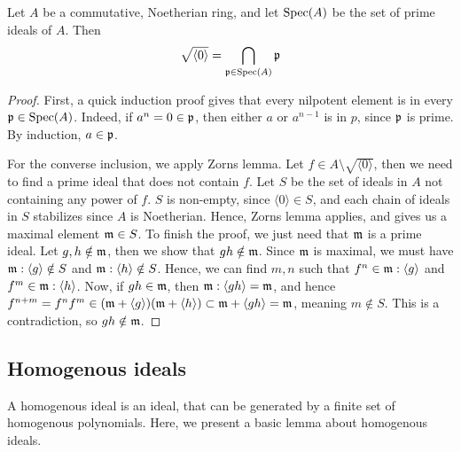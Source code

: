 \begin{theorem}\label{thm:nil_rad_is_cap_primes}
  Let $A$ be a commutative, Noetherian ring, and let $\operatorname{Spec}(A)$ be the set of prime ideals of $A$. Then
  \[\sqrt{\langle 0 \rangle} = \bigcap_{\mathfrak p \in \operatorname{Spec}(A)} \mathfrak p\]
\end{theorem}
\begin{proof}
  First, a quick induction proof gives that every nilpotent element is in every $\mathfrak p \in \operatorname{Spec}(A)$. Indeed, if $a^{n} = 0 \in \mathfrak p$, then either $a$ or $a^{n-1}$ is in $p$, since $\mathfrak p$ is prime. By induction, $a \in \mathfrak p$.

  For the converse inclusion, we apply Zorns lemma. Let $f \in A \setminus \sqrt{\langle 0 \rangle}$, then we need to find a prime ideal that does not contain $f$. Let $S$ be the set of ideals in $A$ not containing any power of $f$. $S$ is non-empty, since $\langle 0 \rangle \in S$, and each chain of ideals in $S$ stabilizes since $A$ is Noetherian. Hence, Zorns lemma applies, and gives us a maximal element $\mathfrak{m} \in S$. To finish the proof, we just need that $\mathfrak{m}$ is a prime ideal. Let $g, h \notin \mathfrak{m}$, then we show that $g h \notin \mathfrak{m}$. Since $\mathfrak{m}$ is maximal, we must have $\mathfrak{m} : \langle g \rangle \notin S$ and $\mathfrak{m} : \langle h \rangle \notin S$. Hence, we can find $m, n$ such that $f^{n} \in \mathfrak{m} : \langle g \rangle$ and $f^{m} \in \mathfrak{m} : \langle h \rangle$. Now, if $g h \in \mathfrak{m}$, then $\mathfrak{m} : \langle g h \rangle = \mathfrak{m}$, and hence $f^{n + m} = f^{n} f^{m} \in (\mathfrak{m} + \langle g \rangle)(\mathfrak{m} + \langle h \rangle) \subset \mathfrak{m} + \langle g h \rangle = \mathfrak{m}$, meaning $m \notin S$. This is a contradiction, so $g h \notin \mathfrak{m}$.
\end{proof}




\subsection{Homogenous ideals}

A homogenous ideal is an ideal, that can be generated by a finite set of homogenous polynomials. Here, we present a basic lemma about homogenous ideals.

